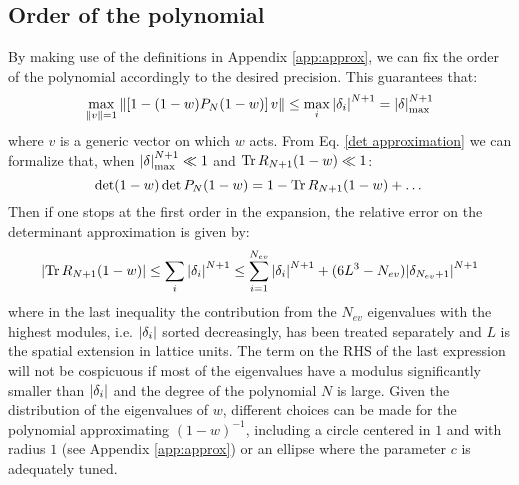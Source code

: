 \subsection{Order of the polynomial}
By making use of the definitions in Appendix \ref{app:approx}, we can fix the order of the polynomial accordingly to the desired precision. This guarantees that:
\begin{equation}
    \max_{\norm{v} = 1} \norm{\left[ 1 - (1-w)P_N(1-w) \right] v} \leq \max_i \abs{\delta_i}^{N+1} = \abs{\delta}_{\textrm{max}}^{N+1}
\end{equation}
where $v$ is a generic vector on which $w$ acts. From Eq. \eqref{det approximation} we can formalize that, when $\abs{\delta}_{\textrm{max}}^{N+1} \ll 1$ and $\Tr R_{N+1}(1-w) \ll 1$:
\begin{equation}
    \det(1-w) \det P_N(1-w) = 1 - \Tr R_{N+1}(1 - w) + \dots
\end{equation}
Then if one stops at the first order in the expansion, the relative error on the determinant approximation is given by:
\begin{equation}
    \abs{\Tr R_{N+1}(1 - w)} \leq \sum_{i} \abs{\delta_i}^{N+1} \leq \sum_{i = 1}^{N_{ev}} \abs{\delta_i}^{N+1} + (6L^3 - N_{ev}) \abs{\delta_{N_{ev} +1}}^{N+1}
\end{equation}
where in the last inequality the contribution from the $N_{ev}$ eigenvalues with the highest modules, i.e. $\abs{\delta_i}$ sorted decreasingly, has been treated separately and $L$ is the spatial extension in lattice units. The term on the RHS of the last expression will not be cospicuous if most of the eigenvalues have a modulus significantly smaller than $\abs{\delta_i}$ and the degree of the polynomial $N$ is large.
Given the distribution of the eigenvalues of $w$, different choices can be made for the polynomial approximating $(1-w)^{-1}$, including a circle centered in $1$ and with radius $1$ (see Appendix \ref{app:approx}) or an ellipse where the parameter $c$ is adequately tuned.


